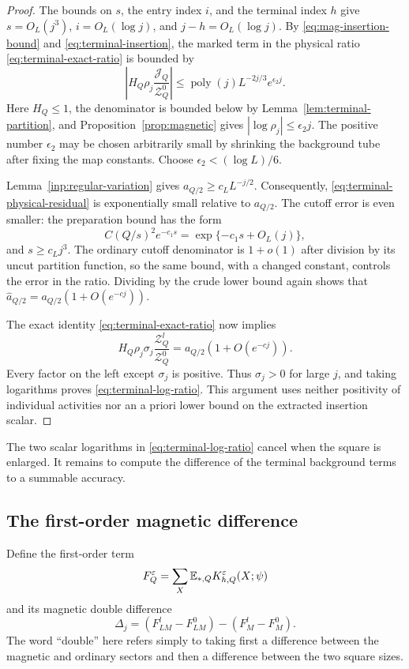 \begin{proof}
The bounds on $s$, the entry index $i$, and the terminal index $h$ give
$s=O_L(j^3)$, $i=O_L(\log j)$, and $j-h=O_L(\log j)$.  By
\eqref{eq:mag-insertion-bound} and
\eqref{eq:terminal-insertion}, the marked term in the physical ratio
\eqref{eq:terminal-exact-ratio} is bounded by
\begin{equation}
 \left|H_Q\rho_j\frac{\mathcal J_Q}{\mathcal Z_Q^0}\right|
 \leq \operatorname{poly}(j)L^{-2j/3}e^{\epsilon_2j}.
 \label{eq:terminal-physical-residual}
\end{equation}
Here $H_Q\leq1$, the denominator is bounded below by
Lemma~\ref{lem:terminal-partition}, and
Proposition~\ref{prop:magnetic} gives
$|\log\rho_j|\leq\epsilon_2j$.  The positive number $\epsilon_2$ may
be chosen arbitrarily small by shrinking the background tube after
fixing the map constants.  Choose $\epsilon_2<(\log L)/6$.

Lemma~\ref{inp:regular-variation} gives
$a_{Q/2}\geq c_L L^{-j/2}$.  Consequently,
\eqref{eq:terminal-physical-residual} is exponentially small relative
to $a_{Q/2}$.  The cutoff error is even smaller: the preparation bound
has the form
\[
 C(Q/s)^2e^{-c_1s}=\exp\{-c_1s+O_L(j)\},
\]
and $s\geq c_Lj^3$.  The ordinary cutoff denominator is
$1+o(1)$ after division by its uncut partition function, so the same
bound, with a changed constant, controls the error in the ratio.
Dividing by the crude lower bound again shows that
$\widehat a_{Q/2}=a_{Q/2}(1+O(e^{-cj}))$.

The exact identity \eqref{eq:terminal-exact-ratio} now implies
\[
 H_Q\rho_j\sigma_j\frac{\mathcal Z_Q^l}{\mathcal Z_Q^0}
       =a_{Q/2}(1+O(e^{-cj})).
\]
Every factor on the left except $\sigma_j$ is positive.  Thus
$\sigma_j>0$ for large $j$, and taking logarithms proves
\eqref{eq:terminal-log-ratio}.  This argument uses neither positivity
of individual activities nor an a priori lower bound on the extracted
insertion scalar.
\end{proof}

The two scalar logarithms in \eqref{eq:terminal-log-ratio} cancel when
the square is enlarged.  It remains to compute the difference of the
terminal background terms to a summable accuracy.

\subsection{The first-order magnetic difference}

Define the first-order term
\[
 F_Q^\varepsilon
   =\sum_X\mathbb E_{*,Q}K^\varepsilon_{h,Q}(X;\psi)
\]
and its magnetic double difference
\[
 \Delta_j=(F_{LM}^l-F_{LM}^0)-(F_M^l-F_M^0).
\]
The word ``double'' here refers simply to taking first a difference
between the magnetic and ordinary sectors and then a difference
between the two square sizes.

